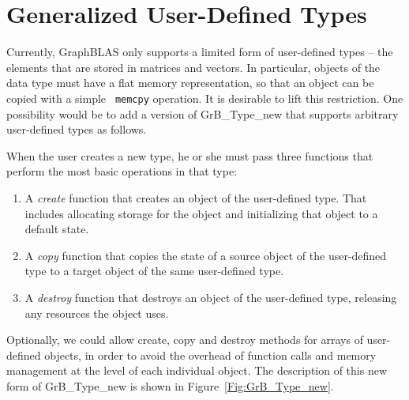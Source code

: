 \section{Generalized User-Defined Types}
\label{Sec:UsrTypes}

Currently, GraphBLAS only supports a limited form of user-defined
types -- the elements that are stored in matrices and vectors. 
In particular, objects of the data type must have a flat memory
representation, so that an object can be copied with a simple {\tt
memcpy} operation.  It is desirable to lift this restriction. One
possibility would be to add a version of {\sf GrB\_Type\_new} that
supports arbitrary user-defined types as follows.

When the user creates a new type, he or she must pass three functions
that perform the most basic operations in that type:
\begin{enumerate}
	\item A \emph{create} function that creates an object of the
	user-defined type. That includes allocating storage for the
	object and initializing that object to a default state.

	\item A \emph{copy} function that copies the state of a source
	object of the user-defined type to a target object of the same
	user-defined type.

	\item A \emph{destroy} function that destroys an object of the
	user-defined type, releasing any resources the object uses.
\end{enumerate}
Optionally, we could allow create, copy and destroy methods for arrays
of user-defined objects, in order to avoid the overhead of function
calls and memory management at the level of each individual object.
The description of this new form of {\sf GrB\_Type\_new} is shown
in Figure~\ref{Fig:GrB_Type_new}.

